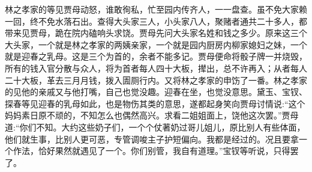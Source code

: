 \begin{parag}
    林之孝家的等见贾母动怒，谁敢徇私，忙至园内传齐人，一一盘查。虽不免大家赖一回，终不免水落石出。查得大头家三人，小头家八人，聚赌者通共二十多人，都带来见贾母，跪在院内磕响头求饶。贾母先问大头家名姓和钱之多少。原来这三个大头家，一个就是林之孝家的两姨亲家，一个就是园内厨房内柳家媳妇之妹，一个就是迎春之乳母。这是三个为首的，余者不能多记。贾母便命将骰子牌一并烧毁，所有的钱入官分散与众人，将为首者每人四十大板，撵出，总不许再入；从者每人二十大板，革去三月月钱，拨入圊厕行内。又将林之孝家的申饬了一番。林之孝家的见他的亲戚又与他打嘴，自己也觉没趣。迎春在坐，也觉没意思。黛玉、宝钗、探春等见迎春的乳母如此，也是物伤其类的意思，遂都起身笑向贾母讨情说:“这个妈妈素日原不顽的，不知怎么也偶然高兴。求看二姐姐面上，饶他这次罢。”贾母道:“你们不知。大约这些奶子们，一个个仗著奶过哥儿姐儿，原比别人有些体面，他们就生事，比别人更可恶，专管调唆主子护短偏向。我都是经过的。况且要拿一个作法，恰好果然就遇见了一个。你们别管，我自有道理。”宝钗等听说，只得罢了。
\end{parag}


